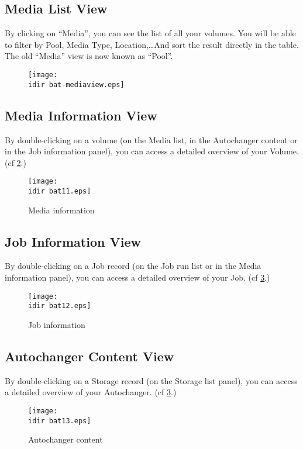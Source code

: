 \subsection{Media List View}

By clicking on ``Media'', you can see the list of all your volumes. You will be
able to filter by Pool, Media Type, Location,\dots And sort the result directly
in the table. The old ``Media'' view is now known as ``Pool''.
\begin{figure}[htbp]
  \centering
  \texttt{[image: \\idir bat-mediaview.eps]}
  \label{fig:mediaview}
\end{figure}


\subsection{Media Information View}

By double-clicking on a volume (on the Media list, in the Autochanger content
or in the Job information panel), you can access a detailed overview of your
Volume. (cf \ref{fig:mediainfo}.)
\begin{figure}[htbp]
  \centering
  \texttt{[image: \\idir bat11.eps]}  
  \caption{Media information}
  \label{fig:mediainfo}
\end{figure}

\subsection{Job Information View}

By double-clicking on a Job record (on the Job run list or in the Media
information panel), you can access a detailed overview of your Job. (cf
\ref{fig:jobinfo}.)
\begin{figure}[htbp]
  \centering
  \texttt{[image: \\idir bat12.eps]}  
  \caption{Job information}
  \label{fig:jobinfo}
\end{figure}

\subsection{Autochanger Content View}

By double-clicking on a Storage record (on the Storage list panel), you can
access a detailed overview of your Autochanger. (cf \ref{fig:jobinfo}.)
\begin{figure}[htbp]
  \centering
  \texttt{[image: \\idir bat13.eps]}  
  \caption{Autochanger content}
  \label{fig:achcontent}
\end{figure}

